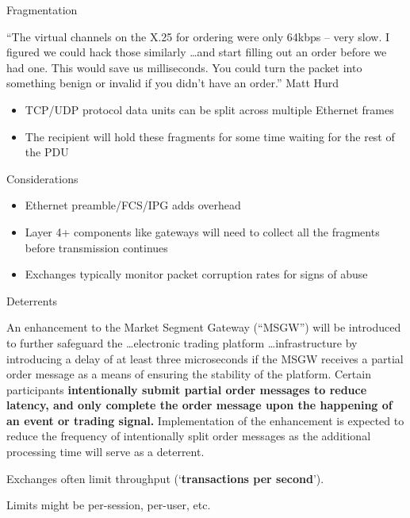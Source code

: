 \documentclass{beamer}
\begin{document}
\begin{frame}{Fragmentation}
	\begin{block}{}
		``The virtual channels on the X.25 for ordering were only 64kbps – very slow. I figured we could hack those similarly \ldots and start filling out an order before we had one. This would save us milliseconds. You could turn the packet into something benign or invalid if you didn’t have an order.'' Matt Hurd
	\end{block}

	\pause
	\begin{itemize}
		\item TCP/UDP protocol data units can be split across multiple Ethernet frames
		\item The recipient will hold these fragments for some time waiting for the rest of the PDU
	\end{itemize}

	\pause
	\begin{block}{Considerations}
		\begin{itemize}
			\item Ethernet preamble/FCS/IPG adds overhead
			\item Layer 4+ components like gateways will need to collect all the fragments before transmission continues
			\item Exchanges typically monitor packet corruption rates for signs of abuse
		\end{itemize}
	\end{block}
\end{frame}

\begin{frame}{Deterrents}
	\begin{block}{}
		An enhancement to the Market Segment Gateway (“MSGW”) will be introduced to further safeguard the \ldots electronic trading platform \ldots infrastructure by introducing a delay of at least three microseconds if the MSGW receives a partial order message as a means of ensuring the stability of the platform. Certain participants \textbf{intentionally submit partial order messages to reduce latency, and only complete the order message upon the happening of an event or trading signal.} Implementation of the enhancement is expected to reduce the frequency of intentionally split order messages as the additional processing time will serve as a deterrent. 
	\end{block}
	Exchanges often limit throughput (`\textbf{transactions per second}').

	Limits might be per-session, per-user, etc.
\end{frame}
\end{document}
